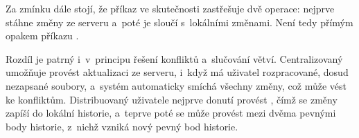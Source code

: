 Za zmínku dále stojí, že příkaz  ve skutečnosti zastřešuje dvě operace: nejprve stáhne změny ze serveru a~poté je sloučí s~lokálními změnami. Není tedy přímým opakem příkazu .

Rozdíl je patrný i~v~principu řešení konfliktů a~slučování větví. Centralizovaný \VCS umožňuje provést aktualizaci ze serveru, i~když má uživatel rozpracované, dosud nezapsané soubory, a~systém automaticky smíchá všechny změny, což může vést ke konfliktům. Distribuovaný \VCS uživatele nejprve donutí provést , čímž se změny zapíší do lokální historie, a~teprve poté se může provést  mezi dvěma pevnými body historie, z~nichž vzniká nový pevný bod historie.



